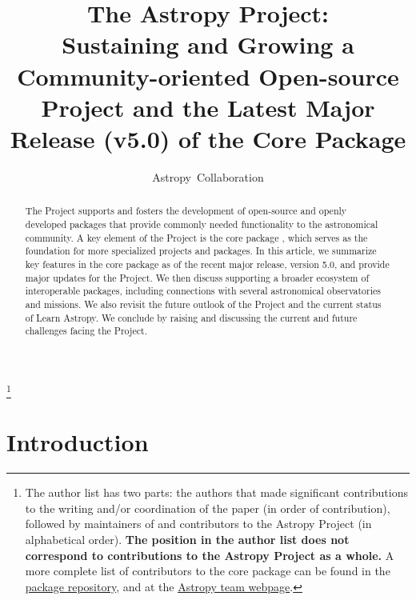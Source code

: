 \documentclass[modern]{aastex631}
\begin{document}
\let\oldtoday\today
\renewcommand{\today}{\oldtoday;\qquad\textnormal{\gitHeader}}

\title{The Astropy Project: \\
       Sustaining and Growing a Community-oriented Open-source Project and
       the Latest Major Release (v5.0) of the Core Package}


\author{Astropy~Collaboration}
\noaffiliation
{\let\thefootnote\relax\footnote{{
  The author list has two parts: the authors that made significant contributions
  to the writing and/or coordination of the paper (in order of contribution),
  followed by maintainers of and contributors to the Astropy Project (in
  alphabetical order). \textbf{The position in the author list does not
  correspond to contributions to the Astropy Project as a whole.} A more
  complete list of contributors to the core package can be found in the
  \href{https://github.com/astropy/astropy/graphs/contributors}{package
  repository}, and at the \href{http://www.astropy.org/team.html}{Astropy team
  webpage}.
}}}




\begin{abstract}
The \astropy Project supports and fosters the development of open-source and openly developed
\python packages that provide commonly needed functionality to the astronomical
community.
A key element of the \astropy Project is the core package \astropypkg, which serves as the
foundation for more specialized projects and packages.
In this article, we summarize key features in the core package as of the recent major
release, version 5.0, and provide major updates for the Project.
We then discuss supporting a broader ecosystem of interoperable packages,
including connections with several astronomical observatories and missions.
We also revisit the future outlook of the \astropy Project and the current
status of Learn Astropy.
We conclude by raising and discussing the current and future challenges facing the Project.
\end{abstract}



\section{Introduction} \label{sec:intro}
\end{document}
